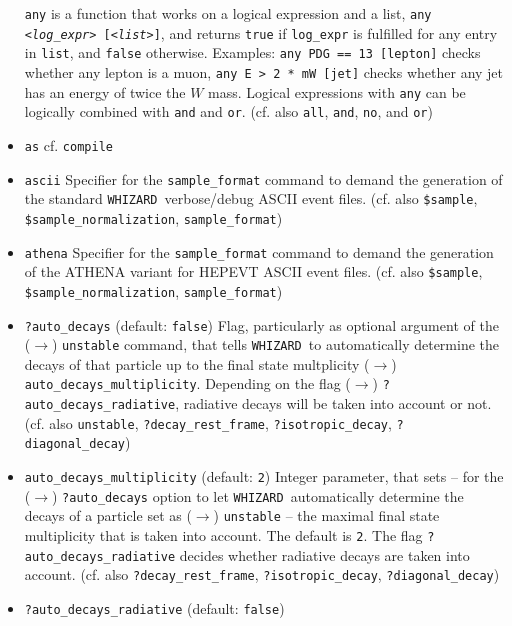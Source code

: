 \documentclass[12pt]{book}
\newcommand{\ttt}[1]{\texttt{#1}}
\newcommand{\whizard}{\texttt{WHIZARD}}
\begin{document}
\begin{itemize}
\ttt{any} is a function that works on a logical expression and a list, 
\ttt{any {\em <log\_expr>} [{\em <list>}]}, and returns \ttt{true} if
\ttt{log\_expr} is fulfilled for any entry in \ttt{list}, and
\ttt{false} otherwise. Examples: \ttt{any PDG == 13 [lepton]} checks
whether any lepton is a muon, \ttt{any E > 2 * mW [jet]} checks
whether any jet has an energy of twice the $W$ mass. Logical
expressions with \ttt{any} can be logically combined with \ttt{and}
and \ttt{or}. (cf. also \ttt{all}, \ttt{and}, \ttt{no}, and \ttt{or})
\item
\ttt{as} \newline
cf. \ttt{compile}
\item
\ttt{ascii} \newline 
Specifier for the \ttt{sample\_format} command to demand the
generation of the standard \whizard\ verbose/debug ASCII event
files. (cf. also \ttt{\$sample}, \ttt{\$sample\_normalization}, 
\ttt{sample\_format}) 
\item
\ttt{athena} \newline 
Specifier for the \ttt{sample\_format} command to demand the
generation of the ATHENA variant for HEPEVT ASCII event
files. (cf. also \ttt{\$sample}, \ttt{\$sample\_normalization}, 
\ttt{sample\_format}) 
\item
\ttt{?auto\_decays} \qquad (default: \ttt{false}) \newline
Flag, particularly as optional argument of the ($\to$) \ttt{unstable}
command, that tells \whizard\ to automatically determine the decays of
that particle up to the final state multplicity ($\to$)
\ttt{auto\_decays\_multiplicity}. Depending on the flag ($\to$)
\ttt{?auto\_decays\_radiative}, radiative decays will be taken into
account or not. (cf. also \ttt{unstable}, \ttt{?decay\_rest\_frame},
\ttt{?isotropic\_decay}, \ttt{?diagonal\_decay}) 
\item
\ttt{auto\_decays\_multiplicity} \qquad (default: \ttt{2}) \newline
Integer parameter, that sets -- for the ($\to$) \ttt{?auto\_decays}
option to let \whizard\ automatically determine the decays of a
particle set as ($\to$) \ttt{unstable} -- the maximal final state
multiplicity that is taken into account. The default is \ttt{2}. The
flag \ttt{?auto\_decays\_radiative} decides whether radiative decays
are taken into account. (cf. also \ttt{?decay\_rest\_frame},
\ttt{?isotropic\_decay}, \ttt{?diagonal\_decay}) 
\item
\ttt{?auto\_decays\_radiative} \qquad (default: \ttt{false}) \newline

\end{itemize}
\end{document}
